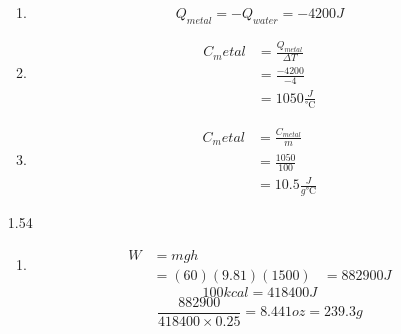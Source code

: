 \documentclass{article}
\begin{document}
\begin{enumerate}
\begin{enumerate}
        \item
            \begin{equation*}
                Q_{metal} = -Q_{water} = -4200J
            \end{equation*}
        \vspace{0.05in}
        \item
            \begin{align*}
                C_metal &= \frac{Q_{metal}}{\Delta T} \\
                &= \frac{-4200}{-4} \\
                &= 1050 \frac{J}{\si{\celsius}}
            \end{align*}
        \vspace{0.05in}
        \item
            \begin{align*}
                C_metal &= \frac{C_{metal}}{m} \\
                &= \frac{1050}{100} \\
                &= 10.5 \frac{J}{g \si{\celsius}}
            \end{align*}
    \end{enumerate}
    \vspace{0.1in}
    \item [1.54]
    \begin{enumerate}
        \item
            \begin{align*}
                W &= mgh \\
                &= (60)(9.81)(1500)
                &= 882900J
            \end{align*}
            \begin{equation*}
                100 kcal = 418400 J
            \end{equation*}
            \begin{equation*}
                \frac{882900}{418400 \times 0.25} = 8.441 oz = 239.3 g
            \end{equation*}
        \vspace{0.05in}

\end{enumerate}
\end{enumerate}
\end{document}
